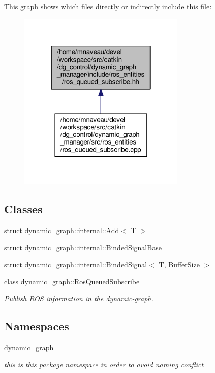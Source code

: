 This graph shows which files directly or indirectly include this file\+:\nopagebreak
\begin{figure}[H]
\begin{center}
\leavevmode
\includegraphics[width=226pt]{ros__queued__subscribe_8hh__dep__incl}
\end{center}
\end{figure}
\subsection*{Classes}
\begin{DoxyCompactItemize}
\item 
struct \hyperlink{structdynamic__graph_1_1internal_1_1Add}{dynamic\+\_\+graph\+::internal\+::\+Add$<$ T $>$}
\item 
struct \hyperlink{structdynamic__graph_1_1internal_1_1BindedSignalBase}{dynamic\+\_\+graph\+::internal\+::\+Binded\+Signal\+Base}
\item 
struct \hyperlink{structdynamic__graph_1_1internal_1_1BindedSignal}{dynamic\+\_\+graph\+::internal\+::\+Binded\+Signal$<$ T, Buffer\+Size $>$}
\item 
class \hyperlink{classdynamic__graph_1_1RosQueuedSubscribe}{dynamic\+\_\+graph\+::\+Ros\+Queued\+Subscribe}
\begin{DoxyCompactList}\small\item\em Publish R\+OS information in the dynamic-\/graph. \end{DoxyCompactList}\end{DoxyCompactItemize}
\subsection*{Namespaces}
\begin{DoxyCompactItemize}
\item 
 \hyperlink{namespacedynamic__graph}{dynamic\+\_\+graph}
\begin{DoxyCompactList}\small\item\em this is this package namespace in order to avoid naming conflict \end{DoxyCompactList}\end{DoxyCompactItemize}
